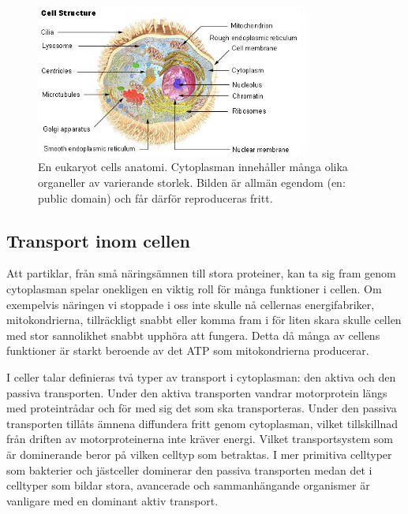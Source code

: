 \begin{figure}\centering
\includegraphics[width=0.8\textwidth]{bilder/Illu_cell_structure.jpg}
\caption{En eukaryot cells anatomi. Cytoplasman innehåller många olika organeller av varierande storlek. \footnotesize Bilden är allmän egendom\cite{wiki:illu_cell_structure} (en: public domain) och får därför reproduceras fritt.}
\label{fig:cell_struktur}
\end{figure}


\subsection{Transport inom cellen}

Att partiklar, från små näringsämnen till stora proteiner, kan ta sig fram genom cytoplasman spelar onekligen en viktig roll för många funktioner i cellen. Om exempelvis näringen vi stoppade i oss inte skulle nå cellernas energifabriker, mitokondrierna, tillräckligt snabbt eller komma fram i för liten skara skulle cellen med stor sannolikhet snabbt upphöra att fungera. Detta då många av cellens funktioner är starkt beroende av det ATP som mitokondrierna\footnotemark{} producerar.

I celler talar definieras två typer av transport i cytoplasman: den aktiva och den passiva transporten. Under den aktiva transporten vandrar motorprotein längs med proteintrådar och för med sig det som ska transporteras. Under den passiva transporten tillåts ämnena diffundera fritt genom cytoplasman, vilket tillskillnad från driften av motorproteinerna inte kräver energi. 
Vilket transportsystem som är dominerande beror på vilken celltyp som betraktas. I mer primitiva celltyper som bakterier och jästceller dominerar den passiva transporten medan det i celltyper som bildar stora, avancerade och sammanhängande organismer är vanligare med en dominant aktiv transport. 

